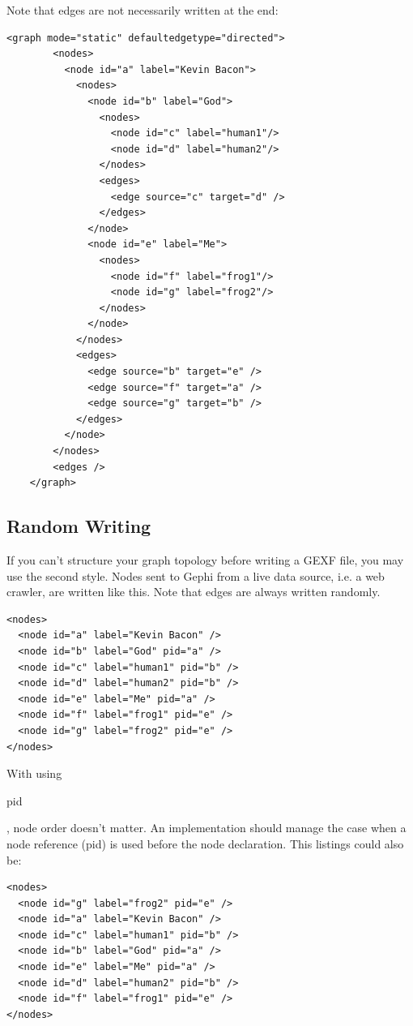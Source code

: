\documentclass[a4paper,10pt]{article}
\begin{document}
Note that edges are not necessarily written at the end:
\lstset{ style=gexf }
\begin{lstlisting}[caption={First way with edges inside clusters},label=hierarchy11]
    <graph mode="static" defaultedgetype="directed">
        <nodes>
          <node id="a" label="Kevin Bacon">
            <nodes>
              <node id="b" label="God">
                <nodes>
                  <node id="c" label="human1"/>
                  <node id="d" label="human2"/>
                </nodes>
                <edges>
                  <edge source="c" target="d" />
                </edges>
              </node>
              <node id="e" label="Me">
                <nodes>
                  <node id="f" label="frog1"/>
                  <node id="g" label="frog2"/>
                </nodes>
              </node>
            </nodes>
            <edges>
              <edge source="b" target="e" />
              <edge source="f" target="a" />
              <edge source="g" target="b" />
            </edges>
          </node>
        </nodes>
        <edges />
    </graph>
\end{lstlisting}

\subsection{Random Writing}

If you can't structure your graph topology before writing a GEXF file, you may use the second style. Nodes sent to Gephi from a live data source, i.e. a web crawler, are written like this. Note that edges are always written randomly.

\lstset{ style=gexf }
\begin{lstlisting}[caption={Second way},label=hierarchy2]
<nodes>
  <node id="a" label="Kevin Bacon" />
  <node id="b" label="God" pid="a" />
  <node id="c" label="human1" pid="b" />
  <node id="d" label="human2" pid="b" />
  <node id="e" label="Me" pid="a" />
  <node id="f" label="frog1" pid="e" />
  <node id="g" label="frog2" pid="e" />
</nodes>
\end{lstlisting}

With using \begin{footnotesize}pid\end{footnotesize}, node order doesn't matter. An implementation should manage the case when a node reference (pid) is used before the node declaration. This listings could also be:

\lstset{ style=gexf }
\begin{lstlisting}[caption={Second way randomized},label=hierarchy22]
<nodes>
  <node id="g" label="frog2" pid="e" />
  <node id="a" label="Kevin Bacon" />
  <node id="c" label="human1" pid="b" />
  <node id="b" label="God" pid="a" />
  <node id="e" label="Me" pid="a" />
  <node id="d" label="human2" pid="b" />
  <node id="f" label="frog1" pid="e" />
</nodes>
\end{lstlisting}
\end{document}
